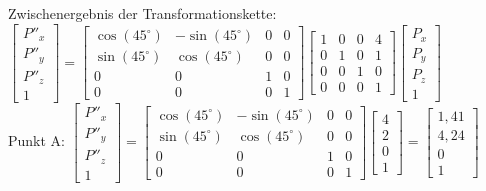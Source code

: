 \documentclass[11pt, a4paper]{article} %
\begin{document}
Zwischenergebnis der Transformationskette: $\begin{bmatrix}
	P''_x \\ P''_y \\ P''_z \\ 1
\end{bmatrix} = \begin{bmatrix}
	\cos(45^\circ) & -\sin(45^\circ) & 0 & 0 \\ \sin(45^\circ) & \cos(45^\circ) & 0 & 0 \\ 0 & 0 & 1 & 0 \\ 0 & 0 & 0 & 1
\end{bmatrix} \begin{bmatrix}
1 & 0 & 0 & 4 \\ 0 & 1 & 0 & 1 \\ 0 & 0 & 1 & 0 \\ 0 & 0 & 0 & 1
\end{bmatrix} \begin{bmatrix}
	P_x \\ P_y \\ P_z \\ 1
\end{bmatrix}$ \\
Punkt A: $\begin{bmatrix}
	P''_x \\ P''_y \\ P''_z \\ 1
\end{bmatrix} = \begin{bmatrix}
	\cos(45^\circ) & -\sin(45^\circ) & 0 & 0 \\ \sin(45^\circ) & \cos(45^\circ) & 0 & 0 \\ 0 & 0 & 1 & 0 \\ 0 & 0 & 0 & 1
\end{bmatrix} \begin{bmatrix}
	4 \\ 2 \\ 0 \\ 1
\end{bmatrix} = \begin{bmatrix}
1,41 \\ 4,24 \\ 0 \\ 1
\end{bmatrix}$ \\
\end{document}
